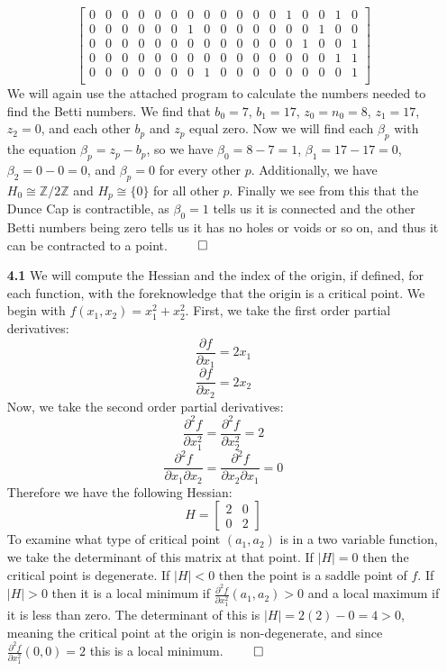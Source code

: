\documentclass[12pt]{report}
\begin{document}
\begin{enumerate}
$$\begin{bmatrix}
 0  & 0  & 0  & 0  & 0  & 0  & 0  & 0  & 0  & 0  & 0  & 0  & 1  & 0  & 0  & 1  & 0  \\ %
 0  & 0  & 0  & 0  & 0  & 0  & 1  & 0  & 0  & 0  & 0  & 0  & 0  & 0  & 1  & 0  & 0  \\ %
 0  & 0  & 0  & 0  & 0  & 0  & 0  & 0  & 0  & 0  & 0  & 0  & 0  & 1  & 0  & 0  & 1  \\ %
 0  & 0  & 0  & 0  & 0  & 0  & 0  & 0  & 0  & 0  & 0  & 0  & 0  & 0  & 0  & 1  & 1  \\ %
 0  & 0  & 0  & 0  & 0  & 0  & 0  & 1  & 0  & 0  & 0  & 0  & 0  & 0  & 0  & 0  & 1  \\ %
\end{bmatrix}$$
We will again use the attached program to calculate the numbers needed to find the Betti numbers. We find that $b_0 = 7$, $b_1 = 17$, $z_0=n_0=8$, $z_1 = 17$, $z_2=0$, and each other $b_p$ and $z_p$ equal zero. Now we will find each $\beta_p$ with the equation $\beta_p=z_p-b_p$, so we have $\beta_0=8-7=1$, $\beta_1=17-17=0$, $\beta_2=0-0=0$, and $\beta_p = 0$ for every other $p$. Additionally, we have $H_0 \cong \mathbb{Z}/2\mathbb{Z}$ and $H_p \cong \{0\}$ for all other $p$. Finally we see from this that the Dunce Cap is contractible, as $\beta_0=1$ tells us it is connected and the other Betti numbers being zero tells us it has no holes or voids or so on, and thus it can be contracted to a point. $\qed$

\item[\bf 4.1] We will compute the Hessian and the index of the origin, if defined, for each function, with the foreknowledge that the origin is a critical point. We begin with $f(x_1,x_2)=x_1^2+x_2^2$. First, we take the first order partial derivatives:
$$\frac{\partial f}{\partial x_1} = 2x_1$$
$$\frac{\partial f}{\partial x_2} = 2x_2$$
Now, we take the second order partial derivatives:
$$\frac{\partial^2 f}{\partial x_1^2} = \frac{\partial^2 f}{\partial x_2^2} = 2$$
$$\frac{\partial^2 f}{\partial x_1\partial x_2} = \frac{\partial^2 f}{\partial x_2\partial x_1} = 0$$
Therefore we have the following Hessian:
$$H=\begin{bmatrix}
2 & 0 \\
0 & 2 
\end{bmatrix}$$
To examine what type of critical point $(a_1,a_2)$ is in a two variable function, we take the determinant of this matrix at that point. If $|H|=0$ then the critical point is degenerate. If $|H|<0$ then the point is a saddle point of $f$. If $|H|>0$ then it is a local minimum if $\frac{\partial^2 f}{\partial x_1^2}(a_1,a_2) > 0$ and a local maximum if it is less than zero. The determinant of this is $|H| = 2(2)-0=4 > 0$, meaning the critical point at the origin is non-degenerate, and since $\frac{\partial^2 f}{\partial x_1^2}(0,0)=2$ this is a local minimum. $\qed$


\end{enumerate}
\end{document}
